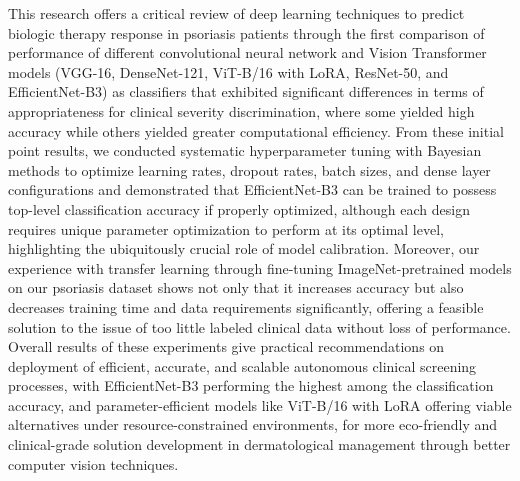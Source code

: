 \documentclass[11pt,journal,compsoc]{IEEEtran}
\begin{document}
This research offers a critical review of deep learning techniques to predict biologic therapy response in psoriasis patients through the first comparison of performance of different convolutional neural network and Vision Transformer models (VGG-16, DenseNet-121, ViT-B/16 with LoRA, ResNet-50, and EfficientNet-B3) as classifiers that exhibited significant differences in terms of appropriateness for clinical severity discrimination, where some yielded high accuracy while others yielded greater computational efficiency. From these initial point results, we conducted systematic hyperparameter tuning with Bayesian methods to optimize learning rates, dropout rates, batch sizes, and dense layer configurations and demonstrated that EfficientNet-B3 can be trained to possess top-level classification accuracy if properly optimized, although each design requires unique parameter optimization to perform at its optimal level, highlighting the ubiquitously crucial role of model calibration. Moreover, our experience with transfer learning through fine-tuning ImageNet-pretrained models on our psoriasis dataset shows not only that it increases accuracy but also decreases training time and data requirements significantly, offering a feasible solution to the issue of too little labeled clinical data without loss of performance. Overall results of these experiments give practical recommendations on deployment of efficient, accurate, and scalable autonomous clinical screening processes, with EfficientNet-B3 performing the highest among the classification accuracy, and parameter-efficient models like ViT-B/16 with LoRA offering viable alternatives under resource-constrained environments, for more eco-friendly and clinical-grade solution development in dermatological management through better computer vision techniques.
\end{document}
